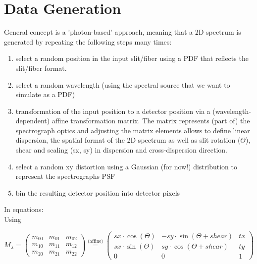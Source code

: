\documentclass[modern]{aastex61}
\begin{document}
\section{Data Generation}
General concept is a 'photon-based' approach, meaning that a 2D spectrum is generated by repeating the following steps many times:
\begin{enumerate}
    \item select a random position in the input slit/fiber using a PDF that reflects the slit/fiber format.
    \item select a random wavelength (using the spectral source that we want to simulate as a PDF)
    \item transformation of the input position to a detector position via a (wavelength-dependent) affine transformation matrix.
The matrix represents (part of) the spectrograph optics and adjusting the matrix elements allows to define linear dispersion, the spatial format of the 2D spectrum as well as slit rotation ($\Theta$), shear and scaling (sx, sy) in dispersion and cross-dispersion direction.
    \item select a random xy distortion using a Gaussian (for now!) distribution to represent the spectrographs PSF
    \item bin the resulting detector position into detector pixels
\end{enumerate}
In equations:\\
Using

   	\[
	M_{\lambda} = \begin{pmatrix} m_{00} & m_{01} & m_{02} \\ m_{10} & m_{11} & m_{12} \\ m_{20} & m_{21} & m_{22} \end{pmatrix}  \stackrel{\text{(affine)}}{=} \begin{pmatrix} sx \cdot \cos(\Theta) & -sy \cdot \sin(\Theta+shear) & tx \\ sx \cdot \sin(\Theta) & sy \cdot \cos(\Theta+shear) & ty \\ 0 & 0 & 1 \end{pmatrix}
	\]
\end{document}
